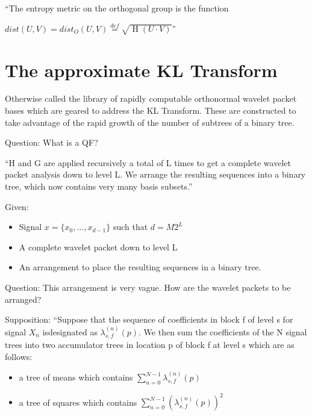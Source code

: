 \documentclass[11pt]{book}
\begin{document}


``The entropy metric on the orthogonal group is the function 

$dist(U,V) = dist_O (U,V) \stackrel{def}{=} \sqrt{\mathrel{H}(U\cdot V)}$''

\chapter {The approximate KL Transform}
Otherwise called the library of rapidly computable orthonormal wavelet packet bases which are geared to address the KL Transform.  These are constructed to take advantage of the rapid growth of the number of subtrees of a binary tree.  

Question: What is a QF?  

``H and G are applied recursively a total of L times to get a complete wavelet packet analysis down to level L.  We arrange the resulting sequences into a binary tree, which now contains very many basis subsets.''  


Given:
\begin{itemize}
\item Signal $x=\{x_0, \ldots , x_{d-1}\} $ such that $ d= M2^L$
\item A complete wavelet packet down to level L
\item An arrangement to place the resulting sequences in a binary tree.
\end{itemize}

Question: This arrangement is very vague.  How are the wavelet packets to be arranged?  


Supposition:  ``Suppose that the sequence of coefficients in block  f of level s for signal $X_n$ isdesignated as $\lambda^{(n)}_{s,f} (p)$.   We then sum the coefficients of the N signal trees into two accumulator trees in location p of block f at level s which are as follows:
\begin{itemize}
\item a tree of means which contains $\sum\limits^{N-1}_{n=0}\lambda^{(n)}_{s,f} (p)$
\item a tree of squares which contains $\sum\limits^{N-1}_{n=0}(\lambda^{(n)}_{s,f} (p))^2$
\end{itemize}
\end{document}

